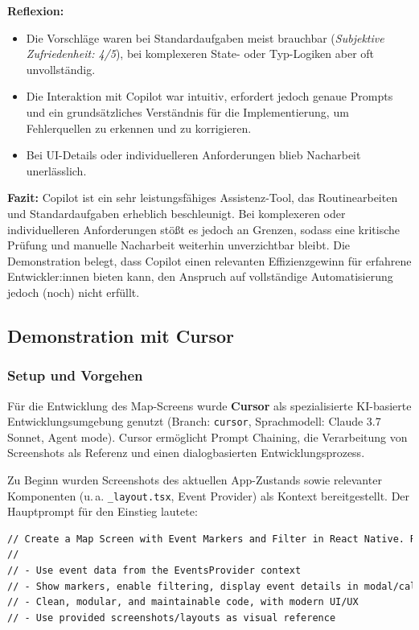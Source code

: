 \textbf{Reflexion:}
\begin{itemize}
      \item Die Vorschläge waren bei Standardaufgaben meist brauchbar (\textit{Subjektive
                  Zufriedenheit: 4/5}), bei komplexeren State- oder Typ-Logiken aber oft
            unvollständig.
      \item Die Interaktion mit Copilot war intuitiv, erfordert jedoch genaue Prompts und
            ein grundsätzliches Verständnis für die Implementierung, um Fehlerquellen zu
            erkennen und zu korrigieren.
      \item Bei UI-Details oder individuelleren Anforderungen blieb Nacharbeit
            unerlässlich.
\end{itemize}

\textbf{Fazit:}
Copilot ist ein sehr leistungsfähiges Assistenz-Tool, das Routinearbeiten und Standardaufgaben erheblich beschleunigt. Bei komplexeren oder individuelleren Anforderungen stößt es jedoch an Grenzen, sodass eine kritische Prüfung und manuelle Nacharbeit weiterhin unverzichtbar bleibt. Die Demonstration belegt, dass Copilot einen relevanten Effizienzgewinn für erfahrene Entwickler:innen bieten kann, den Anspruch auf vollständige Automatisierung jedoch (noch) nicht erfüllt.

\subsection{Demonstration mit Cursor}

\subsubsection{Setup und Vorgehen}
Für die Entwicklung des Map-Screens wurde \textbf{Cursor} als spezialisierte
KI-basierte Entwicklungsumgebung genutzt (Branch: \texttt{cursor},
Sprachmodell: Claude 3.7 Sonnet, Agent mode). Cursor ermöglicht Prompt
Chaining, die Verarbeitung von Screenshots als Referenz und einen
dialogbasierten Entwicklungsprozess.

Zu Beginn wurden Screenshots des aktuellen App-Zustands sowie relevanter
Komponenten (u.\,a. \texttt{\_layout.tsx}, Event Provider) als Kontext
bereitgestellt. Der Hauptprompt für den Einstieg lautete:

\begin{lstlisting}[language=HTML]
// Create a Map Screen with Event Markers and Filter in React Native. Requirements:
//
// - Use event data from the EventsProvider context
// - Show markers, enable filtering, display event details in modal/callout
// - Clean, modular, and maintainable code, with modern UI/UX 
// - Use provided screenshots/layouts as visual reference
\end{lstlisting}

